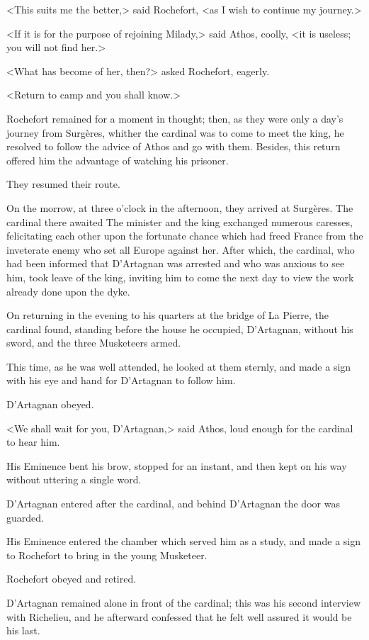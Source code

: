 <This suits me the better,> said Rochefort, <as I wish to continue my journey.> 

<If it is for the purpose of rejoining Milady,> said Athos, coolly, <it is useless; you will not find her.> 

<What has become of her, then?> asked Rochefort, eagerly. 

<Return to camp and you shall know.> 

Rochefort remained for a moment in thought; then, as they were only a day's journey from Surgères, whither the cardinal was to come to meet the king, he resolved to follow the advice of Athos and go with them. Besides, this return offered him the advantage of watching his prisoner. 

They resumed their route. 

On the morrow, at three o'clock in the afternoon, they arrived at Surgères. The cardinal there awaited  The minister and the king exchanged numerous caresses, felicitating each other upon the fortunate chance which had freed France from the inveterate enemy who set all Europe against her. After which, the cardinal, who had been informed that D'Artagnan was arrested and who was anxious to see him, took leave of the king, inviting him to come the next day to view the work already done upon the dyke. 

On returning in the evening to his quarters at the bridge of La Pierre, the cardinal found, standing before the house he occupied, D'Artagnan, without his sword, and the three Musketeers armed. 

This time, as he was well attended, he looked at them sternly, and made a sign with his eye and hand for D'Artagnan to follow him. 

D'Artagnan obeyed. 

<We shall wait for you, D'Artagnan,> said Athos, loud enough for the cardinal to hear him. 

His Eminence bent his brow, stopped for an instant, and then kept on his way without uttering a single word. 

D'Artagnan entered after the cardinal, and behind D'Artagnan the door was guarded. 

His Eminence entered the chamber which served him as a study, and made a sign to Rochefort to bring in the young Musketeer. 

Rochefort obeyed and retired. 

D'Artagnan remained alone in front of the cardinal; this was his second interview with Richelieu, and he afterward confessed that he felt well assured it would be his last. 

